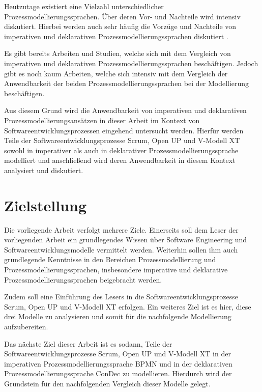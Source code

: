 Heutzutage existiert eine Vielzahl unterschiedlicher Prozessmodellierungssprachen. Über deren Vor- und Nachteile wird intensiv diskutiert. Hierbei werden auch sehr häufig die Vorzüge und Nachteile von imperativen und deklarativen Prozessmodellierungssprachen diskutiert \cite{fahland2010}. \newline

Es gibt bereits Arbeiten und Studien, welche sich mit dem Vergleich von imperativen und deklarativen Prozessmodellierungssprachen beschäftigen. Jedoch gibt es noch kaum Arbeiten, welche sich intensiv mit dem Vergleich der Anwendbarkeit der beiden Prozessmodellierungssprachen bei der Modellierung beschäftigen.\newline

Aus diesem Grund wird die Anwendbarkeit von imperativen und deklarativen Prozessmodellierungsansätzen in dieser Arbeit im Kontext von Softwareentwicklungsprozessen eingehend untersucht werden. Hierfür werden Teile der Softwareentwicklungsprozesse Scrum, Open UP und V-Modell XT sowohl in imperativer als auch in deklarativer Prozessmodellierungssprache modelliert und anschließend wird deren Anwendbarkeit in diesem Kontext analysiert und diskutiert.\newline



\section{Zielstellung}
Die vorliegende Arbeit verfolgt mehrere Ziele. Einerseits soll dem Leser der vorliegenden Arbeit ein grundlegendes Wissen über Software Engineering und Softwareentwicklungsmodelle vermittelt werden. Weiterhin sollen ihm auch grundlegende Kenntnisse in den Bereichen Prozessmodellierung und Prozessmodellierungssprachen, insbesondere imperative und deklarative Prozessmodellierungssprachen beigebracht werden. \newline

Zudem soll eine Einführung des Lesers in die Softwareentwicklungsprozesse Scrum, Open UP und V-Modell XT erfolgen. Ein weiteres Ziel ist es hier, diese drei Modelle zu analysieren und somit für die nachfolgende Modellierung aufzubereiten.\newline

Das nächste Ziel dieser Arbeit ist es sodann, Teile der Softwareentwicklungsprozesse Scrum, Open UP und V-Modell XT in der imperativen Prozessmodellierungssprache BPMN und in der deklarativen Prozessmodellierungssprache ConDec zu modellieren. Hierdurch wird der Grundstein für den nachfolgenden Vergleich dieser Modelle gelegt.\newline


